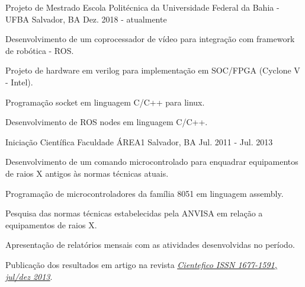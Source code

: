 \begin{cventries}
  \cventry
    {Projeto de Mestrado} %
    {Escola Politécnica da Universidade Federal da Bahia - UFBA} %
    {Salvador, BA} %
    {Dez. 2018 - atualmente} %
    {
      \begin{cvitems} %
        \item {Desenvolvimento de um coprocessador de vídeo para integração com framework de robótica - ROS.}
        \item {Projeto de hardware em verilog para implementação em SOC/FPGA (Cyclone V - Intel).}
        \item {Programação socket em linguagem C/C++ para linux.}
        \item {Desenvolvimento de ROS nodes em linguagem C/C++.}
      \end{cvitems}
    }

  \cventry
    {Iniciação Científica} %
    {Faculdade ÁREA1} %
    {Salvador, BA} %
    {Jul. 2011 - Jul. 2013} %
    {
      \begin{cvitems} %
        \item {Desenvolvimento de um comando microcontrolado para enquadrar equipamentos de raios X antigos às normas técnicas atuais.}
        \item {Programação de microcontroladores da família 8051 em linguagem assembly.}
        \item {Pesquisa das normas técnicas estabelecidas pela ANVISA em relação a equipamentos de raios X.}
        \item {Apresentação de relatórios mensais com as atividades desenvolvidas no período.}
        \item {Publicação dos resultados em artigo na revista \underline{\href{https://cientefico.emnuvens.com.br/cientefico/article/view/58}{\emph{Cientefico ISSN 1677-1591, jul/dez 2013}}}.}
      \end{cvitems}
    }
    

\end{cventries}

